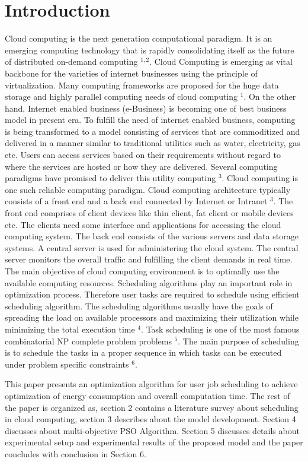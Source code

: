 \documentclass[10pt]{article}
\begin{document}
\section{Introduction}
Cloud computing is the next generation computational paradigm. It is an emerging computing technology that is rapidly consolidating itself as the future of distributed on-demand computing ${ }^{1,2}$. Cloud Computing is emerging as vital backbone for the varieties of internet businesses using the principle of virtualization. Many computing frameworks are proposed for the huge data storage and highly parallel computing needs of cloud computing ${ }^{1}$. On the other hand, Internet enabled business (e-Business) is becoming one of best business model in present era. To fulfill the need of internet enabled business, computing is being transformed to a model consisting of services that are commoditized and delivered in a manner similar to traditional utilities such as water, electricity, gas etc. Users can access services based on their requirements without regard to where the services are hosted or how they are delivered. Several computing paradigms have promised to deliver this utility computing ${ }^{3}$. Cloud computing is one such reliable computing paradigm. Cloud computing architecture typically consists of a front end and a back end connected by Internet or Intranet ${ }^{3}$. The front end comprises of client devices like thin client, fat client or mobile devices etc. The clients need some interface and applications for accessing the cloud computing system. The back end consists of the various servers and data storage systems. A central server is used for administering the cloud system. The central server monitors the overall traffic and fulfilling the client demands in real time. The main objective of cloud computing environment is to optimally use the available computing resources. Scheduling algorithms play an important role in optimization process. Therefore user tasks are required to schedule using efficient scheduling algorithm. The scheduling algorithms usually have the goals of spreading the load on available processors and maximizing their utilization while minimizing the total execution time ${ }^{4}$. Task scheduling is one of the most famous combinatorial NP complete problem problems ${ }^{5}$. The main purpose of scheduling is to schedule the tasks in a proper sequence in which tasks can be executed under problem specific constraints ${ }^{6}$.

This paper presents an optimization algorithm for user job scheduling to achieve optimization of energy consumption and overall computation time. The rest of the paper is organized as, section 2 contains a literature survey about scheduling in cloud computing, section 3 describes about the model development. Section 4 discusses about multi-objective PSO Algorithm. Section 5 discusses details about experimental setup and experimental results of the proposed model and the paper concludes with conclusion in Section 6.
\end{document}
